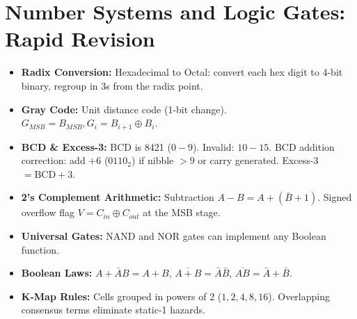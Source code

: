 \chapter{Number Systems and Logic Gates: Rapid Revision}

\begin{highyieldbox}
\begin{itemize}[leftmargin=*]
    \item \textbf{Radix Conversion:} Hexadecimal to Octal: convert each hex digit to 4-bit binary, regroup in 3s from the radix point.
    \item \textbf{Gray Code:} Unit distance code (1-bit change). $G_{MSB} = B_{MSB}, G_i = B_{i+1} \oplus B_i$.
    \item \textbf{BCD \& Excess-3:} BCD is 8421 ($0-9$). Invalid: $10-15$. BCD addition correction: add $+6$ ($0110_2$) if nibble $> 9$ or carry generated. Excess-3 $= \text{BCD} + 3$.
    \item \textbf{2's Complement Arithmetic:} Subtraction $A - B = A + (\bar{B} + 1)$. Signed overflow flag $V = C_{in} \oplus C_{out}$ at the MSB stage.
    \item \textbf{Universal Gates:} NAND and NOR gates can implement any Boolean function.
    \item \textbf{Boolean Laws:} $A + \bar{A}B = A + B$, $\overline{A + B} = \bar{A}\bar{B}$, $\overline{AB} = \bar{A} + \bar{B}$.
    \item \textbf{K-Map Rules:} Cells grouped in powers of 2 ($1, 2, 4, 8, 16$). Overlapping consensus terms eliminate static-1 hazards.
\end{itemize}
\end{highyieldbox}
